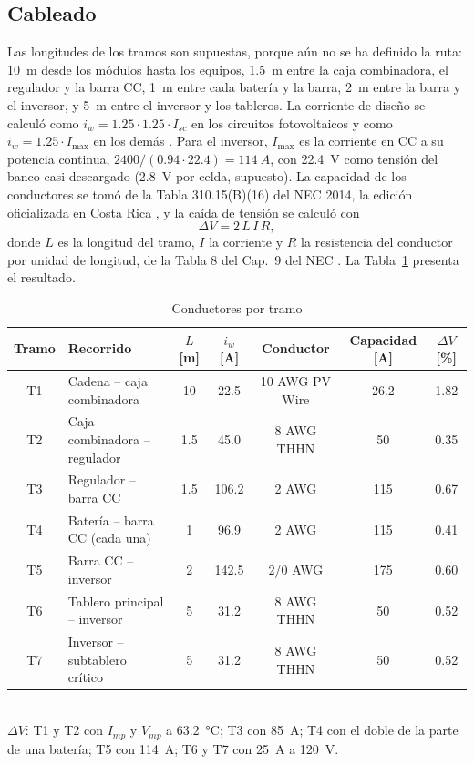 \subsection{Cableado}

Las longitudes de los tramos son supuestas, porque aún no se ha definido la ruta: \SI{10}{m} desde los módulos hasta los equipos, \SI{1.5}{m} entre la caja combinadora, el regulador y la barra CC, \SI{1}{m} entre cada batería y la barra, \SI{2}{m} entre la barra y el inversor, y \SI{5}{m} entre el inversor y los tableros. La corriente de diseño se calculó como $i_w=1.25\cdot1.25\cdot I_{sc}$ en los circuitos fotovoltaicos y como $i_w=1.25\cdot I_{\max}$ en los demás \cite{nec2014}. Para el inversor, $I_{\max}$ es la corriente en CC a su potencia continua, $2400/(0.94\cdot22.4)=\SI{114}{A}$, con \SI{22.4}{V} como tensión del banco casi descargado (\SI{2.8}{V} por celda, supuesto). La capacidad de los conductores se tomó de la Tabla 310.15(B)(16) del NEC 2014, la edición oficializada en Costa Rica \cite{codigo_electrico, nec2014}, y la caída de tensión se calculó con
\begin{equation}
\Delta V = 2\,L\,I\,R,
\end{equation}
donde $L$ es la longitud del tramo, $I$ la corriente y $R$ la resistencia del conductor por unidad de longitud, de la Tabla 8 del Cap.~9 del NEC \cite{nec2014}. La Tabla~\ref{tab:cables} presenta el resultado.

\begin{table}[!htb]
\caption{Conductores por tramo}
\label{tab:cables}
\centering
\footnotesize
\setlength{\tabcolsep}{2.5pt}
\begin{tabular}{c l c c c c c}
\toprule
Tramo & Recorrido & $L$ [m] & $i_w$ [A] & Conductor & Capacidad [A] & $\Delta V$ [\%] \\
\midrule
T1 & Cadena -- caja combinadora & 10 & 22.5 & 10 AWG PV Wire & 26.2 & 1.82 \\
T2 & Caja combinadora -- regulador & 1.5 & 45.0 & 8 AWG THHN & 50 & 0.35 \\
T3 & Regulador -- barra CC & 1.5 & 106.2 & 2 AWG & 115 & 0.67 \\
T4 & Batería -- barra CC (cada una) & 1 & 96.9 & 2 AWG & 115 & 0.41 \\
T5 & Barra CC -- inversor & 2 & 142.5 & 2/0 AWG & 175 & 0.60 \\
T6 & Tablero principal -- inversor & 5 & 31.2 & 8 AWG THHN & 50 & 0.52 \\
T7 & Inversor -- subtablero crítico & 5 & 31.2 & 8 AWG THHN & 50 & 0.52 \\
\bottomrule
\end{tabular}
\\[2pt]
{\footnotesize $\Delta V$: T1 y T2 con $I_{mp}$ y $V_{mp}$ a \SI{63.2}{\celsius}; T3 con \SI{85}{A}; T4 con el doble de la parte de una batería; T5 con \SI{114}{A}; T6 y T7 con \SI{25}{A} a \SI{120}{V}.}
\end{table}

